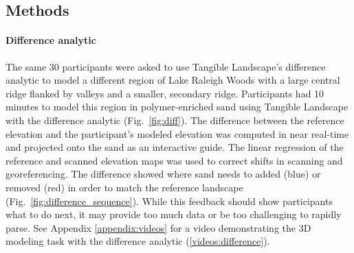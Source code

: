 \documentclass[prodmode,acmtochi]{acmsmall} %
\begin{document}
\subsection{Methods}

% 
%


\paragraph{Difference analytic}
The same 30 participants were asked to use 
Tangible Landscape's difference analytic to model 
a different region of Lake Raleigh Woods
with a large central ridge 
flanked by valleys 
and a smaller, secondary ridge.
Participants had 10 minutes to model this region
in polymer-enriched sand using Tangible Landscape 
with the difference analytic (Fig.~\ref{fig:diff}). 
The difference between the reference elevation 
and the participant's modeled elevation %
was computed in near real-time and projected onto the sand 
as an interactive guide.
The linear regression of the reference and scanned elevation maps was used
to correct shifts in scanning and georeferencing. 
The difference showed where sand needs to added (blue) or removed (red) 
in order to match the reference landscape (Fig.~\ref{fig:difference_sequence}). 
While this feedback should show participants what to do next, 
it may provide too much data or be too challenging to rapidly parse.
%
See Appendix \ref{appendix:videos}
for a video demonstrating the 3D modeling task with the difference analytic (\ref{videos:difference}).

\end{document}
